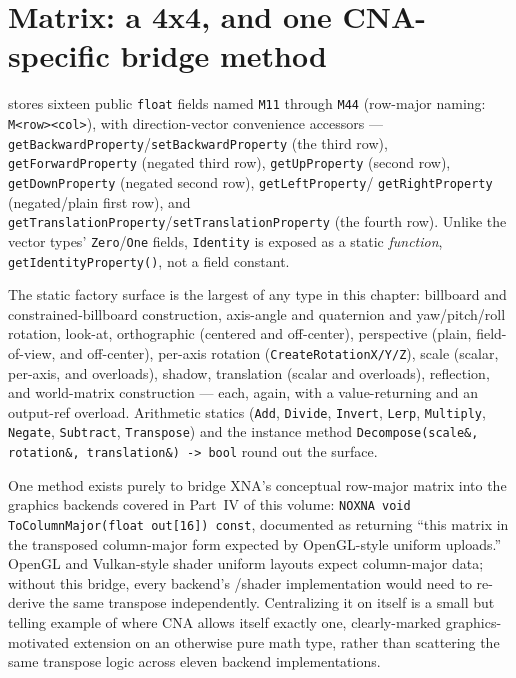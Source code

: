 \section{Matrix: a 4x4, and one CNA-specific bridge method}

 stores sixteen public \texttt{float} fields named \texttt{M11}
through \texttt{M44} (row-major naming: \texttt{M<row><col>}), with direction-vector
convenience accessors --- \texttt{getBackwardProperty}/\texttt{setBackwardProperty} (the
third row), \texttt{getForwardProperty} (negated third row), \texttt{getUpProperty} (second
row), \texttt{getDownProperty} (negated second row), \texttt{getLeftProperty}/%
\texttt{getRightProperty} (negated/plain first row), and
\texttt{getTranslationProperty}/\texttt{setTranslationProperty} (the fourth row). Unlike the
vector types' \texttt{Zero}/\texttt{One} fields, \texttt{Identity} is exposed as a static
\emph{function}, \texttt{getIdentityProperty()}, not a field constant.

The static factory surface is the largest of any type in this chapter: billboard and
constrained-billboard construction, axis-angle and quaternion and yaw/pitch/roll rotation,
look-at, orthographic (centered and off-center), perspective (plain, field-of-view, and
off-center), per-axis rotation (\texttt{CreateRotationX/Y/Z}), scale (scalar, per-axis, and
 overloads), shadow, translation (scalar and 
overloads), reflection, and world-matrix construction --- each, again, with a value-returning
and an output-ref overload. Arithmetic statics (\texttt{Add}, \texttt{Divide},
\texttt{Invert}, \texttt{Lerp}, \texttt{Multiply}, \texttt{Negate}, \texttt{Subtract},
\texttt{Transpose}) and the instance method \texttt{Decompose(scale\&, rotation\&,
translation\&) -> bool} round out the surface.

One method exists purely to bridge XNA's conceptual row-major matrix into the graphics
backends covered in Part~IV of this volume: \texttt{NOXNA void ToColumnMajor(float
out[16]) const}, documented as returning ``this matrix in the transposed column-major form
expected by OpenGL-style uniform uploads.'' OpenGL and Vulkan-style shader uniform layouts
expect column-major data; without this bridge, every backend's /shader
implementation would need to re-derive the same transpose independently. Centralizing it on
 itself is a small but telling example of where CNA allows itself exactly
one, clearly-marked graphics-motivated extension on an otherwise pure math type, rather than
scattering the same transpose logic across eleven backend implementations.

